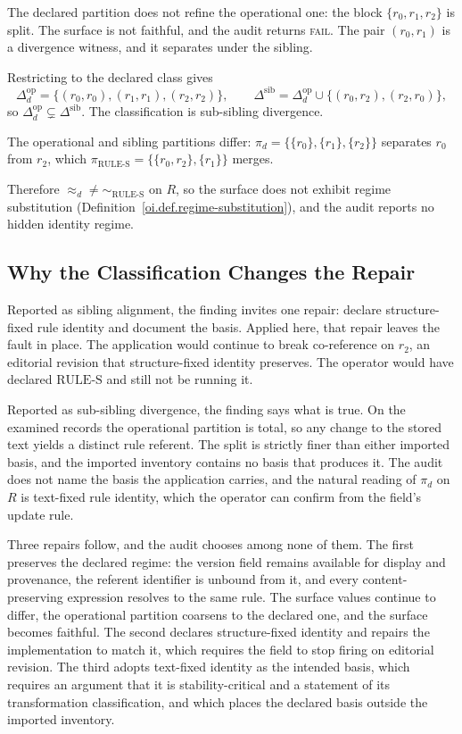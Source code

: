 \documentclass[11pt]{article}
\theoremstyle{plain}
\theoremstyle{definition}
\theoremstyle{remark}
\newcommand{\RULES}{\ensuremath{\mathrm{RULE\text{-}S}}}
\newcommand{\Dop}{\ensuremath{\Delta^{\mathrm{op}}_{d}}}
\newcommand{\Dsib}{\ensuremath{\Delta^{\mathrm{sib}}}}
\newcommand{\FAIL}{\textnormal{\textsc{fail}}}
\begin{document}
The declared partition does not refine the operational one:
the block \(\{r_0,r_1,r_2\}\) is split.
The surface is not faithful, and the audit returns \FAIL{}.
The pair \((r_0,r_1)\) is a divergence witness,
and it separates under the sibling.

Restricting to the declared class gives
\[
  \Dop
  =
  \bigl\{(r_0,r_0),(r_1,r_1),(r_2,r_2)\bigr\},
  \qquad
  \Dsib
  =
  \Dop\cup\bigl\{(r_0,r_2),(r_2,r_0)\bigr\},
\]
so \(\Dop\subsetneq\Dsib\).
The classification is sub-sibling divergence.

The operational and sibling partitions differ:
\(\pi_d=\bigl\{\{r_0\},\{r_1\},\{r_2\}\bigr\}\)
separates \(r_0\) from \(r_2\),
which \(\pi_{\RULES}=\bigl\{\{r_0,r_2\},\{r_1\}\bigr\}\) merges.

Therefore \(\approx_d\neq{\sim_{\RULES}}\) on \(R\),
so the surface does not exhibit regime substitution
(Definition~\ref{oi.def.regime-substitution}),
and the audit reports no hidden identity regime.

\subsection{Why the Classification Changes the Repair}

Reported as sibling alignment, the finding invites one repair:
declare structure-fixed rule identity and document the basis.
Applied here, that repair leaves the fault in place.
The application would continue to break co-reference on \(r_2\),
an editorial revision that structure-fixed identity preserves.
The operator would have declared \RULES{} and still not be running it.

Reported as sub-sibling divergence, the finding says what is true.
On the examined records the operational partition is total,
so any change to the stored text yields a distinct rule referent.
The split is strictly finer than either imported basis,
and the imported inventory contains no basis that produces it.
The audit does not name the basis the application carries,
and the natural reading of \(\pi_d\) on \(R\)
is text-fixed rule identity,
which the operator can confirm from the field's update rule.

Three repairs follow, and the audit chooses among none of them.
The first preserves the declared regime:
the version field remains available for display and provenance,
the referent identifier is unbound from it,
and every content-preserving expression resolves to the same rule.
The surface values continue to differ,
the operational partition coarsens to the declared one,
and the surface becomes faithful.
The second declares structure-fixed identity
and repairs the implementation to match it,
which requires the field to stop firing on editorial revision.
The third adopts text-fixed identity as the intended basis,
which requires an argument that it is stability-critical
and a statement of its transformation classification,
and which places the declared basis outside the imported inventory.
\end{document}
